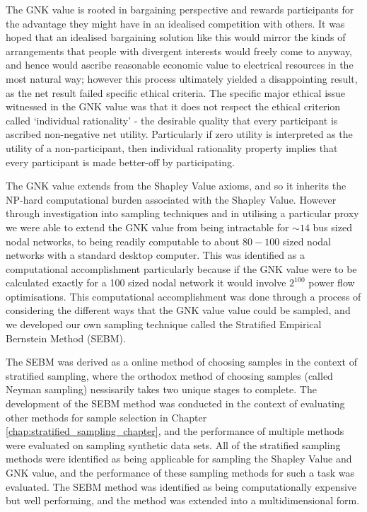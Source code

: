 The GNK value is rooted in bargaining perspective and rewards participants for the advantage they might have in an idealised competition with others.
It was hoped that an idealised bargaining solution like this would mirror the kinds of arrangements that people with divergent interests would freely come to anyway, and hence would ascribe reasonable economic value to electrical resources in the most natural way; however this process ultimately yielded a disappointing result, as the net result failed specific ethical criteria.
The specific major ethical issue witnessed in the GNK value was that it does not respect the ethical criterion called `individual rationality' - the desirable quality that every participant is ascribed non-negative net utility.
Particularly if zero utility is interpreted as the utility of a non-participant, then individual rationality property implies that every participant is made better-off by participating.

The GNK value extends from the Shapley Value axioms, and so it inherits the NP-hard computational burden associated with the Shapley Value.
However through investigation into sampling techniques and in utilising a particular proxy we were able to extend the GNK value from being intractable for $\sim 14$ bus sized nodal networks, to being readily computable to about $80-100$ sized nodal networks with a standard desktop computer.
This was identified as a computational accomplishment particularly because if the GNK value were to be calculated exactly for a 100 sized nodal network it would involve $2^{100}$ power flow optimisations.
This computational accomplishment was done through a process of considering the different ways that the GNK value value could be sampled, and we developed our own sampling technique called the Stratified Empirical Bernstein Method (SEBM).

The SEBM was derived as a online method of choosing samples in the context of stratified sampling, where the orthodox method of choosing samples (called Neyman sampling) nessisarily takes two unique stages to complete.
The development of the SEBM method was conducted in the context of evaluating other methods for sample selection in Chapter \ref{chap:stratified_sampling_chapter}, and the performance of multiple methods were evaluated on sampling synthetic data sets.
All of the stratified sampling methods were identified as being applicable for sampling the Shapley Value and GNK value, and the performance of these sampling methods for such a task was evaluated.
The SEBM method was identified as being computationally expensive but well performing, and the method was extended into a multidimensional form.

